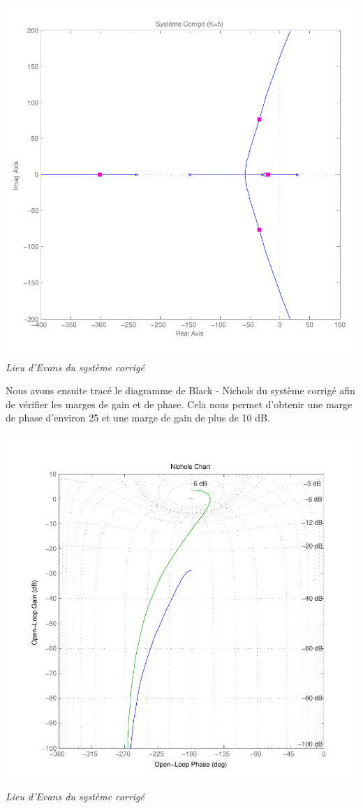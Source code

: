 \documentclass[11pt, french]{article} %
\begin{document}
\begin{center}
\includegraphics[scale=0.50]{RL_Sys_AvPh_K5.pdf}
\\
\emph{Lieu d'Evans du système corrigé}
\end{center}

Nous avons ensuite tracé le diagramme de Black - Nichols du système corrigé afin de vérifier les marges de gain et de phase. Cela nous permet d'obtenir une marge de phase d'environ 25 et une marge de gain de plus de 10 dB.

\begin{center}
\includegraphics[scale=0.50]{MatBlack.pdf}
\\
\emph{Lieu d'Evans du système corrigé}
\end{center}
\end{document}
